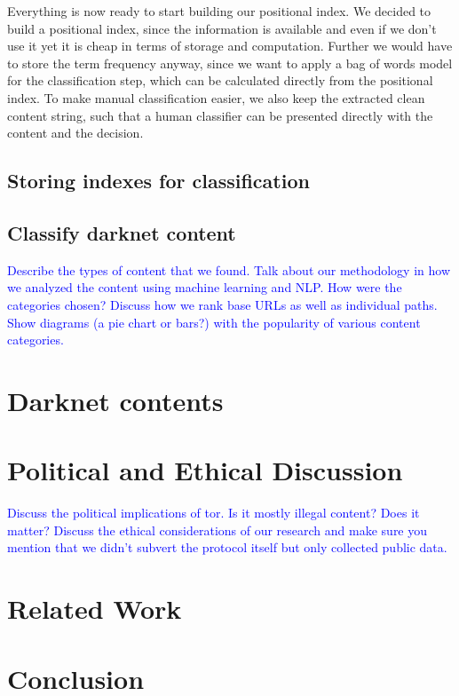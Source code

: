 \documentclass[USenglish,oneside,twocolumn]{article}
\newcommand\CONTENT[1]{\textcolor{blue}{#1}}
\begin{document}
Everything is now ready to start building our positional index. We decided to build a positional index, since the information is available and even if we don't use it yet it is cheap in terms of storage and computation. Further we would have to store the term frequency anyway, since we want to apply a bag of words model for the classification step, which can be calculated directly from the positional index.
To make manual classification easier, we also keep the extracted clean content string, such that a human classifier can be presented directly with the content and the decision.

\subsection{Storing indexes for classification}


\subsection{Classify darknet content}

\CONTENT{Describe the types of content that we found. Talk about our methodology in how we analyzed the content using machine learning and NLP. How were the categories chosen? Discuss how we rank base URLs as well as individual paths. Show diagrams (a pie chart or bars?) with the popularity of various content categories.}

\section{Darknet contents}

\section{Political and Ethical Discussion}

\CONTENT{Discuss the political implications of tor. Is it mostly illegal content? Does it matter? Discuss the ethical considerations of our research and make sure you mention that we didn’t subvert the protocol itself but only collected public data.}

\section{Related Work}

\section{Conclusion}
\end{document}
